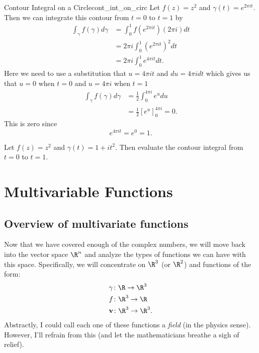         \begin{ex}{Contour Integral on a Circle}{cont_int_on_circ}
        Let $f(z)=z^2$ and $\gamma(t)=e^{2\pi i t}$. Then we can integrate this contour from $t=0$ to $t=1$ by
        \begin{align*}
            \int_\gamma f(\gamma)d\gamma &= \int_0^1 f\left(e^{2\pi i t}\right) (2\pi i)dt\\
            &= 2\pi i \int_0^1 \left(e^{2\pi i t}\right)^2 dt\\
            &= 2\pi i \int_0^1 e^{4\pi i t} dt.
        \end{align*}
        Here we need to use a substitution that $u=4\pi i t$ and $du=4\pi i dt$ which gives us that $u=0$ when $t=0$ and $u=4\pi i$ when $t=1$
        \begin{align*}
            \int_\gamma f(\gamma)d\gamma &= \frac{1}{2}\int_0^{4\pi i} e^u du\\
            &= \frac{1}{2} \left[ e^u \right]_0^{4\pi i}=0.
        \end{align*}
        This is zero since
        \[
        e^{4\pi i t}=e^0=1.
        \]
        \end{ex}
        
        \begin{exercise}
        Let $f(z)=z^2$ and $\gamma(t)=1+it^2$.  Then evaluate the contour integral from $t=0$ to $t=1$.
        \end{exercise}
        
        
        \chapter{Multivariable Functions}
        
        \section{Overview of multivariate functions}
        Now that we have covered enough of the complex numbers, we will move back into the vector space $\R^n$ and analyze the types of functions we can have with this space.  Specifically, we will concentrate on $\R^3$ (or $\R^2$) and functions of the form:
        \begin{align}
            &\gamma\colon \R \to \R^3\\
            &f\colon \R^3 \to \R\\
            &\mathbf{v}\colon \R^3 \to \R^3.
        \end{align}
        Abstractly, I could call each one of these functions a \emph{field} (in the physics sense).  However, I'll refrain from this (and let the mathematicians breathe a sigh of relief).
        
